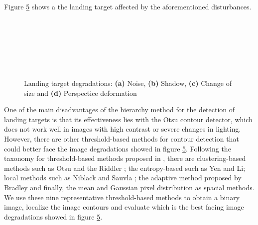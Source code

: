 Figure \ref{fig:tar_degradations} shows a the landing target affected by the aforementioned disturbances.
  
\begin{figure}[!ht]
    \centering
    \begin{subfigure}[b]{0.3\textwidth}
        \caption{}
        \label{fig:deg_noise}
    \end{subfigure}
        ~ %
    \begin{subfigure}[b]{0.3\textwidth}
        \caption{}
        \label{fig:deg_shadow}
    \end{subfigure}\\
        ~ %
    \begin{subfigure}[b]{0.3\textwidth}
        \caption{}
        \label{fig:deg_resolution}
    \end{subfigure}
        ~ %
    \begin{subfigure}[b]{0.3\textwidth}
        \caption{}
        \label{fig:deg_deformation}
    \end{subfigure}
    \caption{ Landing target degradations: \textbf{(a)} Noise, \textbf{(b)} Shadow, \textbf{(c)} Change of size and \textbf{(d)} Perspectice deformation}\label{fig:tar_degradations}
\end{figure}

One of the main disadvantages of the hierarchy method for the detection of landing targets is that its effectiveness lies with the Otsu contour detector, which does not work well in images with high contrast or severe changes in lighting. However, there are other threshold-based methods for contour detection that could better face the image degradations showed in figure \ref{fig:tar_degradations}. Following the taxonomy for threshold-based methods proposed in \citep{Sezgin.Sankur:EI:2010}, there are clustering-based methods such as Otsu \citep{Otsu:SMC:1979} and the Riddler \citep{Ridler.Calvard:TSMC:1978}; the entropy-based such as Yen\citep{Yen.Chang.ea:TIP:1995} and Li\citep{Li.Lee:ICPR:1993}; local methods such as Niblack \citep{Niblack:ImageProcc:1986} and Sauvla \citep{Sauvola.Pietikainen:ICPR:2000}; the adaptive method proposed by Bradley \citep{Bradley.Roth:ACM:2007} and finally, the mean and Gaussian pixel distribution as spacial methods. 
We use these nine representative threshold-based methods to obtain a binary image, localize the image contours and evaluate which is the best facing image degradations showed in figure \ref{fig:tar_degradations}.


